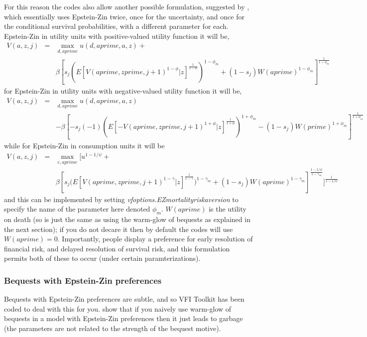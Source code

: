 For this reason the codes also allow another possible formulation, suggested by \cite*{CordobaRipoll2017}, which essentially uses Epstein-Zin twice, once for the uncertainty, and once for the conditional survival probabilities, with a different parameter for each. Epstein-Zin in utility units with positive-valued utility function it will be,
\begin{eqnarray*}
 V(a,z,j)&=& \max_{d,aprime} u(d,aprime,a,z) + \\
 && \beta [ s_j \left( E[ V(aprime,zprime,j+1)^{1-\phi}|z]^{\frac{1}{1-\phi}} \right)^{1-\phi_m} + (1-s_j) W(aprime)^{1-\phi_m} ]^{\frac{1}{1-\phi_m}}
\end{eqnarray*}
for Epstein-Zin in utility units with negative-valued utility function it will be,
\begin{eqnarray*}
 V(a,z,j)&=& \max_{d,aprime} u(d,aprime,a,z) \\
 && - \beta [- s_j (-1) \left( E[ - V(aprime,zprime,j+1)^{1+\phi}|z]^{\frac{1}{1+\phi}} \right)^{1+\phi_m} - (1-s_j) W(prime)^{1+\phi_m} ]^{\frac{1}{1+\phi_m}}
\end{eqnarray*}
while for Epstein-Zin in consumption units it will be
\begin{eqnarray*}
 V(a,z,j)&=& \max_{c,aprime} \big[ u^{1-1/\psi} +  \\
 && \beta [ s_j \big( E[ V(aprime,zprime,j+1)^{1-\gamma}|z]^{\frac{1}{1-\gamma}} \big)^{1-\gamma_m} + (1-s_j)W(aprime)^{1-\gamma_m}  ]^{\frac{1-1/\psi}{1-\gamma_m}} \big]^{\frac{1}{1-1/\psi}}
\end{eqnarray*}
and this can be implemented by setting \textit{vfoptions.EZmortalityriskaversion} to specify the name of the parameter here denoted $\phi_m$. $W(aprime)$ is the utility on death (so is just the same as using the warm-glow of bequests as explained in the next section); if you do not decare it then by default the codes will use $W(aprime)=0$. Importantly, people display a preference for early resolution of financial risk, and delayed resolution of survival risk, and this formulation permits both of these to occur (under certain paramterizations).

\subsubsection{Bequests with Epstein-Zin preferences} \label{app:EZbequests}
Bequests with Epstein-Zin preferences are subtle, and so VFI Toolkit has been coded to deal with this for you. \cite*{KraftMunkWeiss2022} show that if you naively use warm-glow of bequests in a model with Epstein-Zin preferences then it just leads to garbage (the parameters are not related to the strength of the bequest motive).

